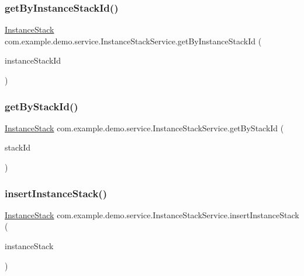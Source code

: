 \subsubsection{\texorpdfstring{get\+By\+Instance\+Stack\+Id()}{getByInstanceStackId()}}
{\footnotesize\ttfamily \mbox{\hyperlink{classcom_1_1example_1_1demo_1_1modular_1_1_instance_stack}{Instance\+Stack}} com.\+example.\+demo.\+service.\+Instance\+Stack\+Service.\+get\+By\+Instance\+Stack\+Id (\begin{DoxyParamCaption}\item[{int}]{instance\+Stack\+Id }\end{DoxyParamCaption})}

\mbox{\label{classcom_1_1example_1_1demo_1_1service_1_1_instance_stack_service_a7e23e13463cadc987d62aac4e07e3dd4}} 
\subsubsection{\texorpdfstring{get\+By\+Stack\+Id()}{getByStackId()}}
{\footnotesize\ttfamily \mbox{\hyperlink{classcom_1_1example_1_1demo_1_1modular_1_1_instance_stack}{Instance\+Stack}} com.\+example.\+demo.\+service.\+Instance\+Stack\+Service.\+get\+By\+Stack\+Id (\begin{DoxyParamCaption}\item[{int}]{stack\+Id }\end{DoxyParamCaption})}

\mbox{\label{classcom_1_1example_1_1demo_1_1service_1_1_instance_stack_service_aa230f3c838d3a44c8cea1c0183175094}} 
\subsubsection{\texorpdfstring{insert\+Instance\+Stack()}{insertInstanceStack()}}
{\footnotesize\ttfamily \mbox{\hyperlink{classcom_1_1example_1_1demo_1_1modular_1_1_instance_stack}{Instance\+Stack}} com.\+example.\+demo.\+service.\+Instance\+Stack\+Service.\+insert\+Instance\+Stack (\begin{DoxyParamCaption}\item[{\mbox{\hyperlink{classcom_1_1example_1_1demo_1_1modular_1_1_instance_stack}{Instance\+Stack}}}]{instance\+Stack }\end{DoxyParamCaption})}



